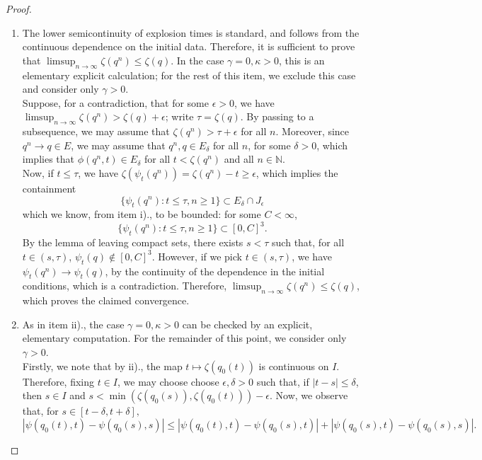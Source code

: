 \documentclass[11pt, notitlepage]{article}
\newcommand{\abs}[1]{\left\lvert{#1}\right\rvert}
\begin{document}
\begin{proof}
\begin{enumerate}[label=\roman{*}).]
    \item The lower semicontinuity of explosion times is standard, and follows from the continuous dependence on the initial data. Therefore, it is sufficient to prove that $\limsup_{n\rightarrow \infty} \zeta(q^n)\le \zeta(q).$ In the case $\gamma=0, \kappa>0$, this is an elementary explicit calculation; for the rest of this item, we exclude this case and consider only $\gamma>0.$ \medskip \\ Suppose, for a contradiction, that for some $\epsilon>0$, we have $\limsup_{n\rightarrow \infty} \zeta(q^n)>\zeta(q)+\epsilon$; write $\tau=\zeta(q)$. By passing to a subsequence, we may assume that $\zeta(q^n)>\tau+\epsilon$ for all $n$. Moreover, since $q^n\rightarrow q \in E$, we may assume that $q^n, q \in E_\delta$ for all $n$, for some $\delta>0$, which implies that $\phi(q^n,t)\in E_\delta$ for all $t<\zeta(q^n)$ and all $n\in \mathbb{N}$.\medskip\\  Now, if $t\le \tau$, we have $\zeta(\psi_t(q^n))=\zeta(q^n)-t \ge \epsilon$, which implies the containment \begin{equation} \{\psi_t(q^n): t\le \tau, n\ge 1\} \subset E_\delta\cap J_\epsilon \end{equation} which we know, from item i)., to be bounded: for some $C<\infty$, \begin{equation}
        \{\psi_t(q^n): t\le \tau, n\ge 1\} \subset [0,C]^3.
    \end{equation} By the lemma of leaving compact sets, there exists $s<\tau$ such that, for all $t\in (s,\tau)$, $\psi_t(q)\not \in [0,C]^3.$ However, if we pick $t\in (s,\tau)$, we have $\psi_t(q^n) \rightarrow \psi_t(q)$, by the continuity of the dependence in the initial conditions, which is a contradiction. Therefore, $\limsup_{n\rightarrow \infty} \zeta(q^n)\le \zeta(q)$, which proves the claimed convergence.      
    \item As in item ii)., the case $\gamma=0, \kappa>0$ can be checked by an explicit, elementary computation. For the remainder of this point, we consider only $\gamma>0$. \medskip \\ Firstly, we note that by ii)., the map $t\mapsto \zeta(q_0(t))$ is continuous on $I$. Therefore, fixing $t\in I$, we may choose choose  $\epsilon, \delta > 0$ such that, if $\abs{t-s} \le \delta$, then $s\in I$ and $s < \min \left(\zeta\left(q_0(s)\right), \zeta\left(q_0(t)\right)\right)-\epsilon$. Now, we observe that, for $s\in [t-\delta, t+\delta],$\begin{equation}
    |\psi(q_0(t),t)-\psi(q_0(s), s)|\le|\psi(q_0(t),t)-\psi(q_0(s), t)|+|\psi(q_0(s),t)-\psi(q_0(s), s)|.

\end{equation}
\end{enumerate}
\end{proof}
\end{document}
